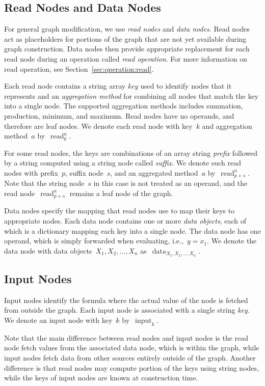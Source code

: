 \documentclass{article}
\DeclareMathOperator{\readNode}{read}
\DeclareMathOperator{\dataNode}{data}
\DeclareMathOperator{\inputNode}{input}
\begin{document}
\subsection{Read Nodes and Data Nodes}

For general graph modification, we use \emph{read nodes} and \emph{data nodes}.
Read nodes act as placeholders for portions of the graph that are not yet available during graph construction.
Data nodes then provide appropriate replacement for each read node during an operation called \emph{read operation}.
For more information on read operation, see Section~\ref{sec:operation:read}.

Each read node contains a string array \emph{key} used to identify nodes that it represents and an \emph{aggregation method} for combining all nodes that match the key into a single node.
The supported aggregation methods includes summation, production, minimum, and maximum.
Read nodes have no operands, and therefore are leaf nodes.
We denote each read node with key~$k$ and aggregation method~$a$ by~$\readNode_k^a$.

For some read nodes, the keys are combinations of an array string \emph{prefix} followed by a string computed using a string node called \emph{suffix}.
We denote such read nodes with prefix~$p$, suffix node~$s$, and an aggregated method~$a$ by~$\readNode_{p+s}^a$.
Note that the string node~$s$ in this case is not treated as an operand, and the read node~$\readNode_{p+s}^a$ remains a leaf node of the graph.


Data nodes specify the mapping that read nodes use to map their keys to appropriate nodes.
Each data node contains one or more \emph{data objects}, each of which is a dictionary mapping each key into a single node.
The data node has one operand, which is simply forwarded when evaluating, i.e.,~$y = x_1$.
We denote the data node with data objects~$X_1, X_2, \dots, X_n$ as~$\dataNode_{X_1, X_2,\dots, X_n}$.

\subsection{Input Nodes}

Input nodes identify the formula where the actual value of the node is fetched from outside the graph.
Each input node is associated with a single string \emph{key}.
We denote an input node with key~$k$ by~$\inputNode_k$.

Note that the main difference between read nodes and input nodes is the read node fetch values from the associated data node, which is within the graph, while input nodes fetch data from other sources entirely outside of the graph.
Another difference is that read nodes may compute portion of the keys using string nodes, while the keys of input nodes are known at construction time.
\end{document}
